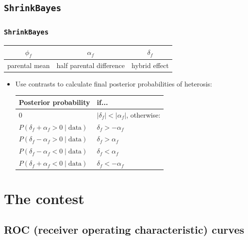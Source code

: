 \documentclass{beamer}
\numberwithin{equation}{section}
\begin{document}
\subsection{{\tt ShrinkBayes}}

\begin{frame}
\frametitle{{\tt ShrinkBayes}}


\begin{center}
\begin{tabular}{c|c|c}
$\phi_f$ & $\alpha_f$ & $\delta_f$ \\ \hline
parental mean & half parental difference & hybrid effect
\end{tabular}
\end{center}
\normalsize

\begin{itemize}
\item Use contrasts to calculate final posterior probabilities of heterosis:

\begin{center}
\begin{tabular}{l|l}
Posterior probability & if... \\ \hline
0 & $|\delta_f| < |\alpha_f|$, otherwise: \\
$P(\delta_f + \alpha_f > 0 \mid \text{data})$ & $\delta_f > -\alpha_f$ \\
$P(\delta_f - \alpha_f > 0 \mid \text{data})$ & $\delta_f > \alpha_f$ \\
$P(\delta_f - \alpha_f < 0 \mid \text{data})$ & $\delta_f < \alpha_f$ \\
$P(\delta_f + \alpha_f < 0 \mid \text{data})$ & $\delta_f < -\alpha_f$ \\
\end{tabular}
\end{center}

\end{itemize}
\end{frame}

\section{The contest}

\subsection{ROC (receiver operating characteristic) curves}
\end{document}
